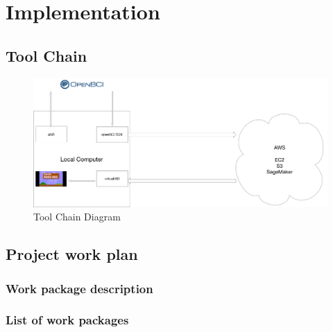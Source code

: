\chapter{Implementation}
\label{cha:implementation}

\section{Tool Chain}
\label{sec:tc}
\begin{figure}[h!]
  \includegraphics[width=\linewidth]{diagram.jpg}
  \caption{Tool Chain Diagram}
  \label{fig:tcd}
\end{figure}


\section{Project work plan}
\label{sec:work-plan}

%

\subsection{Work package description}
\label{sec:wps}








\subsection{List of work packages}
\label{sec:wplist}
\makewplist

